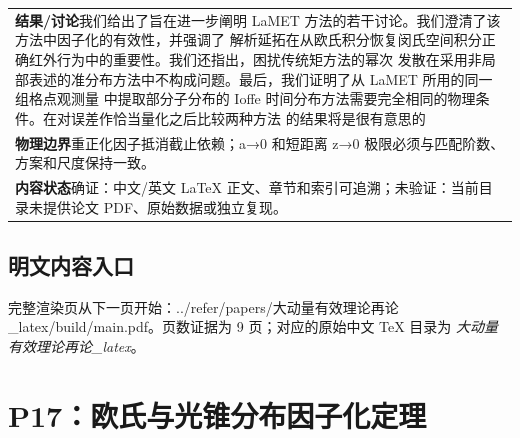 \documentclass[UTF8,11pt,oneside]{ctexbook}
\begin{document}
\begin{table}[htbp]
\begin{tabular}{@{}p{}@{}}
    \textbf{结果/讨论}\quad 我们给出了旨在进一步阐明 LaMET 方法的若干讨论。我们澄清了该方法中因子化的有效性，并强调了 解析延拓在从欧氏积分恢复闵氏空间积分正确红外行为中的重要性。我们还指出，困扰传统矩方法的幂次 发散在采用非局部表述的准分布方法中不构成问题。最后，我们证明了从 LaMET 所用的同一组格点观测量 中提取部分子分布的 Ioffe 时间分布方法需要完全相同的物理条件。在对误差作恰当量化之后比较两种方法 的结果将是很有意思的 \\
    \textbf{物理边界}\quad 重正化因子抵消截止依赖；a→0 和短距离 z→0 极限必须与匹配阶数、方案和尺度保持一致。 \\
    \textbf{内容状态}\quad 确证：中文/英文 LaTeX 正文、章节和索引可追溯；未验证：当前目录未提供论文 PDF、原始数据或独立复现。 \\
    \bottomrule
  \end{tabular}
\end{table}
\section*{明文内容入口}
\noindent 完整渲染页从下一页开始：../\allowbreak{}refer/\allowbreak{}papers/\allowbreak{}大动量有效理论再论\_\allowbreak{}latex/\allowbreak{}build/\allowbreak{}main.pdf。页数证据为 9 页；对应的原始中文 TeX 目录为 \emph{大动量有效理论再论\_latex}。
\clearpage

\clearpage

\chapter{P17：欧氏与光锥分布因子化定理}
\end{document}

